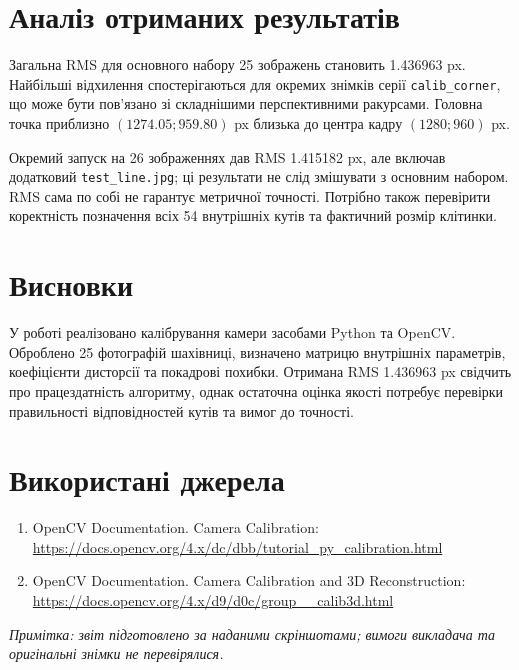 \documentclass[12pt,a4paper]{article}
\begin{document}
	\section{Аналіз отриманих результатів}
	Загальна RMS для основного набору 25 зображень становить 1.436963 px. Найбільші відхилення спостерігаються для окремих знімків серії \texttt{calib\_corner}, що може бути пов'язано зі складнішими перспективними ракурсами. Головна точка приблизно $(1274.05;959.80)$ px близька до центра кадру $(1280;960)$ px.
	
	Окремий запуск на 26 зображеннях дав RMS 1.415182 px, але включав додатковий \texttt{test\_line.jpg}; ці результати не слід змішувати з основним набором. RMS сама по собі не гарантує метричної точності. Потрібно також перевірити коректність позначення всіх 54 внутрішніх кутів та фактичний розмір клітинки.
	\section{Висновки}
	У роботі реалізовано калібрування камери засобами Python та OpenCV. Оброблено 25 фотографій шахівниці, визначено матрицю внутрішніх параметрів, коефіцієнти дисторсії та покадрові похибки. Отримана RMS 1.436963 px свідчить про працездатність алгоритму, однак остаточна оцінка якості потребує перевірки правильності відповідностей кутів та вимог до точності.
	\section{Використані джерела}
	\begin{enumerate}
		\item OpenCV Documentation. Camera Calibration: \url{https://docs.opencv.org/4.x/dc/dbb/tutorial_py_calibration.html}
		\item OpenCV Documentation. Camera Calibration and 3D Reconstruction: \url{https://docs.opencv.org/4.x/d9/d0c/group__calib3d.html}
	\end{enumerate}
	\noindent\textit{Примітка: звіт підготовлено за наданими скріншотами; вимоги викладача та оригінальні знімки не перевірялися.}
\end{document}
